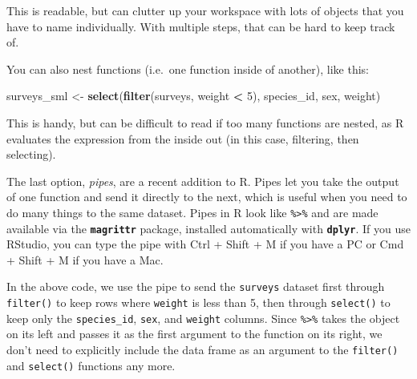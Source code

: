 \documentclass[]{book}
\newenvironment{Shaded}{\begin{snugshade}}{\end{snugshade}}
\newcommand{\KeywordTok}[1]{\textcolor[rgb]{0.13,0.29,0.53}{\textbf{#1}}}
\newcommand{\DecValTok}[1]{\textcolor[rgb]{0.00,0.00,0.81}{#1}}
\newcommand{\StringTok}[1]{\textcolor[rgb]{0.31,0.60,0.02}{#1}}
\newcommand{\OperatorTok}[1]{\textcolor[rgb]{0.81,0.36,0.00}{\textbf{#1}}}
\newcommand{\NormalTok}[1]{#1}
\begin{document}
This is readable, but can clutter up your workspace with lots of objects
that you have to name individually. With multiple steps, that can be
hard to keep track of.

You can also nest functions (i.e.~one function inside of another), like
this:

\begin{Shaded}
\begin{Highlighting}[]
\NormalTok{surveys_sml <-}\StringTok{ }\KeywordTok{select}\NormalTok{(}\KeywordTok{filter}\NormalTok{(surveys, weight }\OperatorTok{<}\StringTok{ }\DecValTok{5}\NormalTok{), species_id, sex, weight)}
\end{Highlighting}
\end{Shaded}

This is handy, but can be difficult to read if too many functions are
nested, as R evaluates the expression from the inside out (in this case,
filtering, then selecting).

The last option, \emph{pipes}, are a recent addition to R. Pipes let you
take the output of one function and send it directly to the next, which
is useful when you need to do many things to the same dataset. Pipes in
R look like \texttt{\%\textgreater{}\%} and are made available via the
\textbf{\texttt{magrittr}} package, installed automatically with
\textbf{\texttt{dplyr}}. If you use RStudio, you can type the pipe with
Ctrl + Shift + M if you have a PC or Cmd + Shift + M if you have a Mac.

\begin{Shaded}
\end{Shaded}

In the above code, we use the pipe to send the \texttt{surveys} dataset
first through \texttt{filter()} to keep rows where \texttt{weight} is
less than 5, then through \texttt{select()} to keep only the
\texttt{species\_id}, \texttt{sex}, and \texttt{weight} columns. Since
\texttt{\%\textgreater{}\%} takes the object on its left and passes it
as the first argument to the function on its right, we don't need to
explicitly include the data frame as an argument to the
\texttt{filter()} and \texttt{select()} functions any more.
\end{document}
